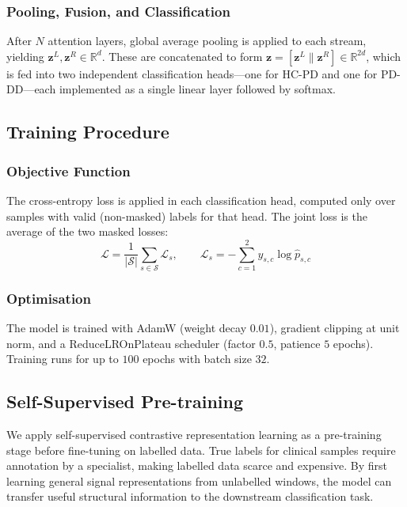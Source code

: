 \documentclass[pmlr]{jmlr}
\begin{document}
\subsubsection{Pooling, Fusion, and Classification}

After $N$ attention layers, global average pooling is applied to each
stream, yielding $\mathbf{z}^L, \mathbf{z}^R \in \mathbb{R}^d$.
These are concatenated to form $\mathbf{z} = [\mathbf{z}^L \|
\mathbf{z}^R] \in \mathbb{R}^{2d}$, which is fed into two independent
classification heads---one for HC-PD and one for PD-DD---each
implemented as a single linear layer followed by softmax.

\subsection{Training Procedure}

\subsubsection{Objective Function}

The cross-entropy loss is applied in each classification head,
computed only over samples with valid (non-masked) labels for that
head. The joint loss is the average of the two masked losses:
\begin{equation}
\mathcal{L} = \frac{1}{|\mathcal{S}|} \sum_{s \in \mathcal{S}}
\mathcal{L}_s, \qquad
\mathcal{L}_s = -\sum_{c=1}^{2} y_{s,c} \log \hat{p}_{s,c}
\end{equation}

\subsubsection{Optimisation}

The model is trained with AdamW (weight decay $0.01$), gradient
clipping at unit norm, and a ReduceLROnPlateau scheduler (factor
$0.5$, patience $5$ epochs). Training runs for up to $100$ epochs
with batch size $32$.

\subsection{Self-Supervised Pre-training}
\label{sec:ssl}

We apply self-supervised contrastive representation learning as a
pre-training stage before fine-tuning on labelled data. True labels
for clinical samples require annotation by a specialist, making
labelled data scarce and expensive. By first learning general signal
representations from unlabelled windows, the model can transfer
useful structural information to the downstream classification task.
\end{document}
